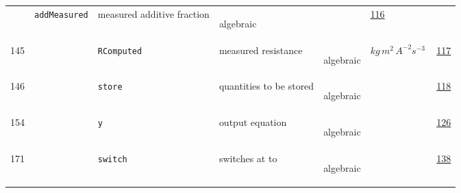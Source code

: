 \begin{longtable}{|p{1cm}|p{2.5cm}|p{4.5cm}|p{8cm}|p{3.0cm}|p{3cm}|p{1cm}|}
             & \verb|addMeasured|
             & measured additive fraction
             & \begin{lay}algebraic \end{lay}
             & $  $
             &                 \hyperlink{"e:116"}{ 116 }
                 \\
        145
             & \hypertarget{"v:145"}{ $ {} $}
             & \verb|RComputed|
             & measured resistance 
             & \begin{lay}algebraic \end{lay}
             & $ kg \,m^{2} \,A^{-2} s^{-3} \, $
             &                 \hyperlink{"e:117"}{ 117 }
                 \\
        146
             & \hypertarget{"v:146"}{ $ {} $}
             & \verb|store|
             & quantities to be stored
             & \begin{lay}algebraic \end{lay}
             & $  $
             &                 \hyperlink{"e:118"}{ 118 }
                 \\
        154
             & \hypertarget{"v:154"}{ $ {} $}
             & \verb|y|
             & output equation
             & \begin{lay}algebraic \end{lay}
             & $  $
             &                 \hyperlink{"e:126"}{ 126 }
                 \\
        171
             & \hypertarget{"v:171"}{ $ {} $}
             & \verb|switch|
             & switches at to
             & \begin{lay}algebraic \end{lay}
             & $  $
             &                 \hyperlink{"e:138"}{ 138 }
                 \\
    \end{longtable}
